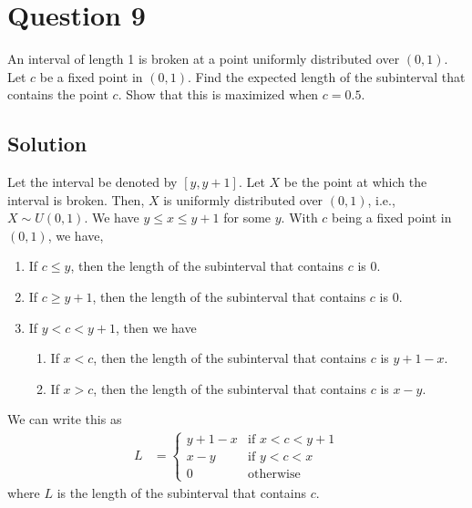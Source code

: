 \section*{Question 9}

An interval of length 1 is broken at a point uniformly distributed over \( (0,1) \).
Let \( c \) be a fixed point in \( (0,1) \).
Find the expected length of the subinterval that contains the point \( c \).
Show that this is maximized when \( c=0.5 \).

\subsection*{Solution}

Let the interval be denoted by \( [y, y+1] \).
Let \( X \) be the point at which the interval is broken.
Then, \( X \) is uniformly distributed over \( (0,1) \), i.e., \( X \sim U(0, 1) \).
We have \( y \leq x \leq y+1 \) for some \( y \).
With \( c \) being a fixed point in \( (0,1) \), we have,
\begin{enumerate}
    \item If \( c \leq y \), then the length of the subinterval that contains \( c \) is \( 0 \).
    \item If \( c \geq y+1 \), then the length of the subinterval that contains \( c \) is \( 0 \).
    \item If \( y < c < y+1 \), then we have
          \begin{enumerate}
              \item If \( x < c \), then the length of the subinterval that contains \( c \) is \( y+1-x \).
              \item If \( x > c \), then the length of the subinterval that contains \( c \) is \( x-y \).
          \end{enumerate}
\end{enumerate}
We can write this as
\begin{align*}
    L
     & =
    \begin{cases}
        y+1-x
         &
        \text{if } x < c < y + 1
        \\
        x-y
         &
        \text{if } y < c < x
        \\
        0
         &
        \text{otherwise}
    \end{cases}
\end{align*}
where \( L \) is the length of the subinterval that contains \( c \).

